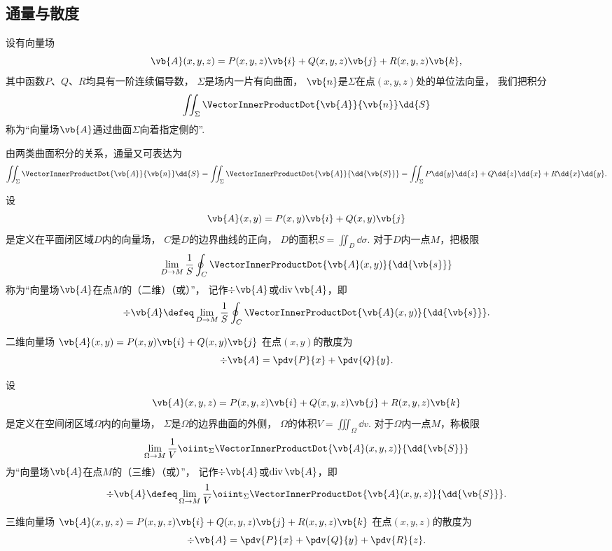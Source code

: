 \subsection{通量与散度}
\begin{definition}
设有向量场\[
	\vb{A}(x,y,z)=P(x,y,z)\vb{i}+Q(x,y,z)\vb{j}+R(x,y,z)\vb{k},
\]
其中函数\(P\)、\(Q\)、\(R\)均具有一阶连续偏导数，
\(\Sigma\)是场内一片有向曲面，
\(\vb{n}\)是\(\Sigma\)在点\((x,y,z)\)处的单位法向量，
我们把积分\[
	\iint_\Sigma \VectorInnerProductDot{\vb{A}}{\vb{n}} \dd{S}
\]称为“向量场\(\vb{A}\)通过曲面\(\Sigma\)向着指定侧的”.
\end{definition}
由两类曲面积分的关系，通量又可表达为\[
	\iint_\Sigma \VectorInnerProductDot{\vb{A}}{\vb{n}} \dd{S}
	=\iint_\Sigma \VectorInnerProductDot{\vb{A}}{\dd{\vb{S}}}
	=\iint_\Sigma P\dd{y}\dd{z}+Q\dd{z}\dd{x}+R\dd{x}\dd{y}.
\]

\begin{definition}[平面上的散度]
\def\defofdiv{\lim_{D \to M} \frac{1}{S} \oint_C \VectorInnerProductDot{\vb{A}(x,y)}{\dd{\vb{s}}}}%
设\[
	\vb{A}(x,y)=P(x,y)\vb{i}+Q(x,y)\vb{j}
\]是定义在平面闭区域\(D\)内的向量场，
\(C\)是\(D\)的边界曲线的正向，
\(D\)的面积\(S = \iint_{D} \dd{\sigma}\).
对于\(D\)内一点\(M\)，把极限\[
	\defofdiv
\]称为“向量场\(\vb{A}\)在点\(M\)的（二维）（或）”，
记作\(\div{\vb{A}}\)或\(\operatorname{div}\vb{A}\)，即\[
	\div{\vb{A}} \defeq \defofdiv.
\]
\end{definition}

\begin{proposition}
二维向量场
\(\vb{A}(x,y)=P(x,y)\vb{i}+Q(x,y)\vb{j}\)
在点\((x,y)\)的散度为\[
	\div{\vb{A}} = \pdv{P}{x}+\pdv{Q}{y}.
\]
\end{proposition}

\begin{definition}[空间中的散度]
\def\defofdiv{\lim_{\Omega \to M} \frac{1}{V} \oiint_\Sigma \VectorInnerProductDot{\vb{A}(x,y,z)}{\dd{\vb{S}}}}%
设\[
	\vb{A}(x,y,z)=P(x,y,z)\vb{i}+Q(x,y,z)\vb{j}+R(x,y,z)\vb{k}
\]是定义在空间闭区域\(\Omega\)内的向量场，
\(\Sigma\)是\(\Omega\)的边界曲面的外侧，
\(\Omega\)的体积\(V = \iiint_\Omega \dd{v}\).
对于\(\Omega\)内一点\(M\)，称极限\[
	\defofdiv
\]为“向量场\(\vb{A}\)在点\(M\)的（三维）（或）”，
记作\(\div{\vb{A}}\)或\(\operatorname{div}\vb{A}\)，即\[
	\div{\vb{A}} \defeq \defofdiv.
\]
\end{definition}

\begin{proposition}
三维向量场
\(\vb{A}(x,y,z)=P(x,y,z)\vb{i}+Q(x,y,z)\vb{j}+R(x,y,z)\vb{k}\)
在点\((x,y,z)\)的散度为\[
	\div{\vb{A}}
	= \pdv{P}{x}+\pdv{Q}{y}+\pdv{R}{z}.
\]
\end{proposition}

